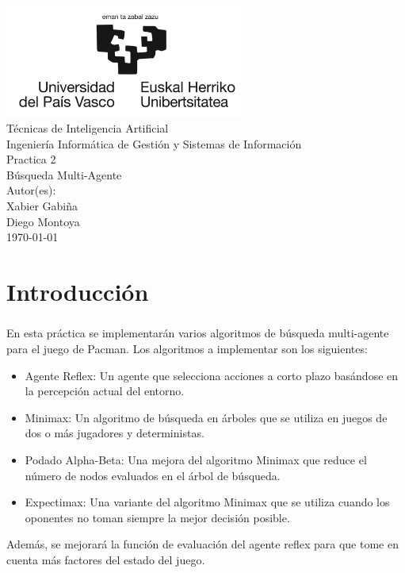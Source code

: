 \documentclass{report}
\begin{document}
    \begin{titlepage}
        \centering
        \includegraphics[width=0.6\textwidth]{./.img/logo.jpg}\\
        \vspace{1cm}
        \LARGE Técnicas de Inteligencia Artificial\\
        \vspace{0.5cm}
        \Large Ingeniería Informática de Gestión y Sistemas de Información\\
        \vspace{3cm}
        \Huge Practica 2\\
        \huge Búsqueda Multi-Agente\\
        \vspace{2.5cm}
        \Large Autor(es):\\
        \vspace{0.2cm}
        \large Xabier Gabiña\\
        \large Diego Montoya\\
        \vfill
        \today
    \end{titlepage}
    \tableofcontents
    \listoffigures
    \lstlistoflistings
    \chapter{Introducción}
      \paragraph*{}{
        En esta práctica se implementarán varios algoritmos de búsqueda multi-agente para el juego de Pacman. 
        Los algoritmos a implementar son los siguientes:
        \begin{itemize}
          \item Agente Reflex: Un agente que selecciona acciones a corto plazo basándose en la percepción actual del entorno.
          \item Minimax: Un algoritmo de búsqueda en árboles que se utiliza en juegos de dos o más jugadores y deterministas.
          \item Podado Alpha-Beta: Una mejora del algoritmo Minimax que reduce el número de nodos evaluados en el árbol de búsqueda.
          \item Expectimax: Una variante del algoritmo Minimax que se utiliza cuando los oponentes no toman siempre la mejor decisión posible.
        \end{itemize}
        Además, se mejorará la función de evaluación del agente reflex para que tome en cuenta más factores del estado del juego.
      }
\end{document}
